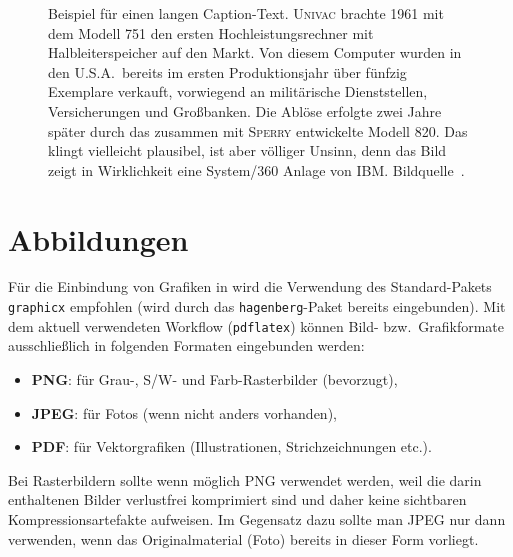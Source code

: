 \begin{figure}
\centering
{}  %
\caption{Beispiel für einen langen Caption-Text. \textsc{Univac}
brachte 1961 mit dem Modell 751 den ersten Hochleistungsrechner
mit Halbleiterspeicher auf den Markt. Von diesem Computer wurden
in den U.S.A.\ bereits im ersten Produktionsjahr über fünfzig
Exemplare verkauft, vorwiegend an militärische Dienststellen,
Versicherungen und Großbanken. Die Ablöse erfolgte zwei Jahre
später durch das zusammen mit \textsc{Sperry} entwickelte Modell 820.
Das klingt vielleicht plausibel, ist aber völliger Unsinn, denn das
Bild zeigt in Wirklichkeit eine System/360 Anlage von IBM. 
Bildquelle~\cite{IBM360}.} 
\label{fig:ibm360}
\end{figure}





\section{Abbildungen}

Für die Einbindung von Grafiken in \latex wird die Verwendung des Stan\-dard-Pakets
\texttt{graphicx} \cite{Carlisle2014} empfohlen 
(wird durch das \texttt{hagenberg}-Paket bereits eingebunden). 
Mit dem aktuell verwendeten Workflow (\texttt{pdflatex})
können Bild- bzw.\ Grafikformate ausschließlich 
in folgenden Formaten eingebunden werden:
%
\begin{itemize}
	\item \textbf{PNG}: für Grau-, S/W- und Farb-Rasterbilder (bevorzugt),
	\item \textbf{JPEG}: für Fotos (wenn nicht anders vorhanden),
	\item \textbf{PDF}: für Vektorgrafiken (Illustrationen, Strichzeichnungen etc.).
\end{itemize}
%
Bei Rasterbildern sollte wenn möglich PNG verwendet werden, weil die darin 
enthaltenen Bilder verlustfrei komprimiert sind und daher keine sichtbaren Kompressionsartefakte
aufweisen. Im Gegensatz dazu sollte man JPEG nur dann verwenden, wenn das Originalmaterial
(Foto) bereits in dieser Form vorliegt.


